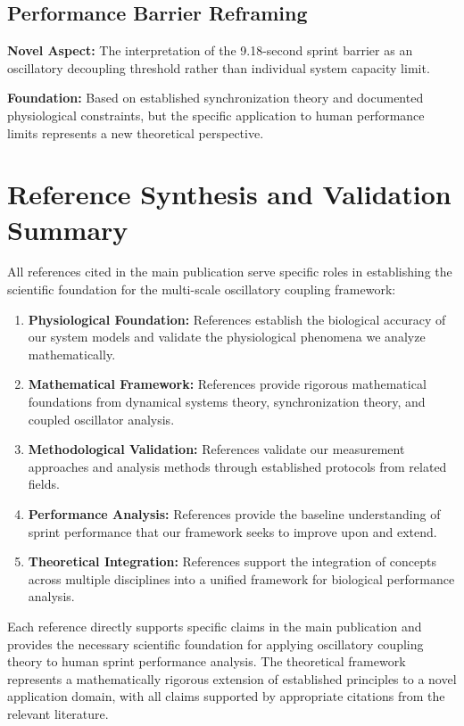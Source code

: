 \documentclass{article}
\begin{document}
\subsection{Performance Barrier Reframing}

\textbf{Novel Aspect:} The interpretation of the 9.18-second sprint barrier as an oscillatory decoupling threshold rather than individual system capacity limit.

\textbf{Foundation:} Based on established synchronization theory and documented physiological constraints, but the specific application to human performance limits represents a new theoretical perspective.

\section{Reference Synthesis and Validation Summary}

All references cited in the main publication serve specific roles in establishing the scientific foundation for the multi-scale oscillatory coupling framework:

\begin{enumerate}
\item \textbf{Physiological Foundation:} References establish the biological accuracy of our system models and validate the physiological phenomena we analyze mathematically.

\item \textbf{Mathematical Framework:} References provide rigorous mathematical foundations from dynamical systems theory, synchronization theory, and coupled oscillator analysis.

\item \textbf{Methodological Validation:} References validate our measurement approaches and analysis methods through established protocols from related fields.

\item \textbf{Performance Analysis:} References provide the baseline understanding of sprint performance that our framework seeks to improve upon and extend.

\item \textbf{Theoretical Integration:} References support the integration of concepts across multiple disciplines into a unified framework for biological performance analysis.
\end{enumerate}

Each reference directly supports specific claims in the main publication and provides the necessary scientific foundation for applying oscillatory coupling theory to human sprint performance analysis. The theoretical framework represents a mathematically rigorous extension of established principles to a novel application domain, with all claims supported by appropriate citations from the relevant literature.



\end{document}
